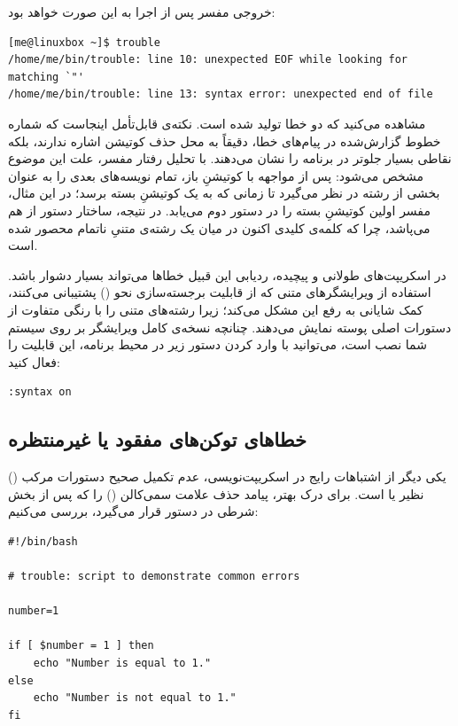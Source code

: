 خروجی مفسر پس از اجرا به این صورت خواهد بود:

\begin{latin}
\begin{lstlisting}
[me@linuxbox ~]$ trouble
/home/me/bin/trouble: line 10: unexpected EOF while looking for matching `"'
/home/me/bin/trouble: line 13: syntax error: unexpected end of file
\end{lstlisting}
\end{latin}

مشاهده می‌کنید که دو خطا تولید شده است. نکته‌ی قابل‌تأمل اینجاست که شماره‌ خطوط گزارش‌شده در پیام‌های خطا، دقیقاً به محل حذف کوتیشن اشاره ندارند، بلکه نقاطی بسیار جلوتر در برنامه را نشان می‌دهند. با تحلیل رفتار مفسر، علت این موضوع مشخص می‌شود:  پس از مواجهه با کوتیشنِ باز، تمام نویسه‌های بعدی را به عنوان بخشی از رشته در نظر می‌گیرد تا زمانی که به یک کوتیشنِ بسته برسد؛ در این مثال، مفسر اولین کوتیشنِ بسته را در دستور  دوم می‌یابد. در نتیجه، ساختار دستور  از هم می‌پاشد، چرا که کلمه‌ی کلیدی  اکنون در میان یک رشته‌ی متنیِ ناتمام محصور شده است.

در اسکریپت‌های طولانی و پیچیده، ردیابی این قبیل خطاها می‌تواند بسیار دشوار باشد. استفاده از ویرایشگرهای متنی که از قابلیت برجسته‌سازی نحو () پشتیبانی می‌کنند، کمک شایانی به رفع این مشکل می‌کند؛ زیرا رشته‌های متنی را با رنگی متفاوت از دستورات اصلی پوسته نمایش می‌دهند. چنانچه نسخه‌ی کامل ویرایشگر  بر روی سیستم شما نصب است، می‌توانید با وارد کردن دستور زیر در محیط برنامه، این قابلیت را فعال کنید:

\begin{latin}
\begin{lstlisting}
:syntax on
\end{lstlisting}
\end{latin}

\subsection{خطاهای توکن‌های مفقود یا غیرمنتظره}

یکی دیگر از اشتباهات رایج در اسکریپت‌نویسی، عدم تکمیل صحیح دستورات مرکب () نظیر  یا  است. برای درک بهتر، پیامد حذف علامت سمی‌کالن (\cmd{;}) را که پس از بخش شرطی در دستور  قرار می‌گیرد، بررسی می‌کنیم:

\begin{latin}
\begin{lstlisting}
#!/bin/bash

# trouble: script to demonstrate common errors

number=1

if [ $number = 1 ] then
    echo "Number is equal to 1."
else
    echo "Number is not equal to 1."
fi
\end{lstlisting}
\end{latin}

